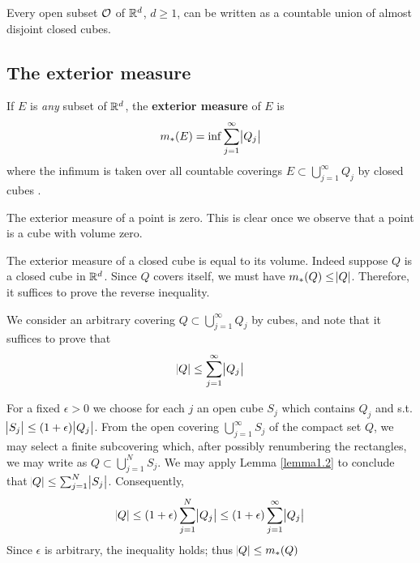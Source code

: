 \documentclass[11pt]{article}
\begin{document}
\begin{theorem}[]
Every open subset \(\mathcal{O}\) of \(\mathbb{R}^d\), \(d\ge 1\), can be written as a countable
union of almost disjoint closed cubes.
\end{theorem}
\subsection{The exterior measure}
\label{sec:org56645fc}
\begin{definition}[]
If \(E\) is \emph{any} subset of \(\mathbb{R}^d\), the \textbf{exterior measure} of \(E\) is
\begin{equation*}
m_*(E)=\inf \displaystyle\sum_{j=1}^\infty\abs{Q_j}
\end{equation*}
   where the infimum is taken over all countable coverings
   \(E\subset\bigcup_{j=1}^\infty Q_j\) by closed cubes
.
\end{definition}
\begin{examplle}[]
The exterior measure of a point is zero. This is clear once we observe that a
point is a cube with volume zero.
\end{examplle}

\begin{examplle}[]
The exterior measure of a closed cube is equal to its volume. Indeed suppose
\(Q\) is a closed cube in \(\mathbb{R}^d\). Since \(Q\) covers itself, we must have
\(m_*(Q)\le\abs{Q}\). Therefore, it suffices to prove the reverse inequality.

We consider an arbitrary covering \(Q\subset\bigcup_{j=1}^\infty Q_j\) by
cubes, and note that it suffices to prove that
\begin{equation*}
\abs{Q}\le \displaystyle\sum_{j=1}^\infty\abs{Q_j}
\end{equation*}

For a fixed \(\epsilon>0\) we choose for each \(j\) an open cube \(S_j\) which
contains \(Q_j\) and s.t. \(\abs{S_j}\le(1+\epsilon)\abs{Q_j}\). From the open
covering \(\bigcup_{j=1}^\infty S_j\) of the compact set \(Q\), we may select a
finite subcovering which, after possibly renumbering the rectangles, we may
write as \(Q\subset\bigcup_{j=1}^NS_j\). We may apply Lemma \ref{lemma1.2} to
conclude that \(\abs{Q}\le\sum_{j=1}^N\abs{S_j}\). Consequently,
\begin{equation*}
\abs{Q}\le(1+\epsilon)\displaystyle\sum_{j=1}^N\abs{Q_j}\le(1+\epsilon)
\displaystyle\sum_{j=1}^\infty\abs{Q_j}
\end{equation*}
Since \(\epsilon\) is arbitrary, the inequality holds; thus \(\abs{Q}\le m_*(Q)\)
\end{examplle}
\end{document}
